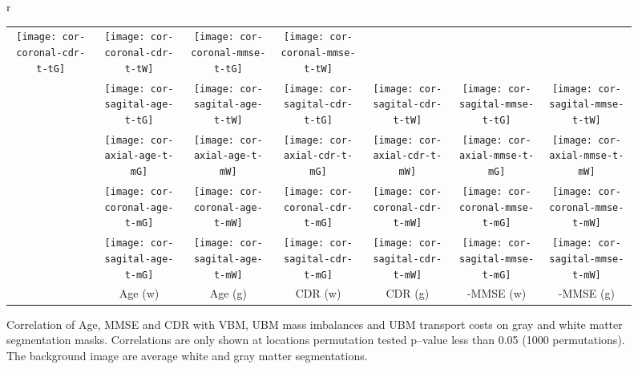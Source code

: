 \documentclass{llncs}
\begin{document}
\begin{figure}[!h]
\begin{tabular}{r}
\begin{tabular}{c|cc||cc||cc}
\texttt{[image: cor-coronal-cdr-t-tG]} &
\texttt{[image: cor-coronal-cdr-t-tW]} &
\texttt{[image: cor-coronal-mmse-t-tG]} &
\texttt{[image: cor-coronal-mmse-t-tW]} \\ 
&
\texttt{[image: cor-sagital-age-t-tG]} &
\texttt{[image: cor-sagital-age-t-tW]} &
\texttt{[image: cor-sagital-cdr-t-tG]} &
\texttt{[image: cor-sagital-cdr-t-tW]} &
\texttt{[image: cor-sagital-mmse-t-tG]} &
\texttt{[image: cor-sagital-mmse-t-tW]} \\ 
  \hline 
  \hline
  \raisebox{1mm}{ \multirow{3}{4mm}{ \rotatebox[origin=c]{90}{UTM Mass} }} &
\texttt{[image: cor-axial-age-t-mG]} &
\texttt{[image: cor-axial-age-t-mW]} &
\texttt{[image: cor-axial-cdr-t-mG]} &
\texttt{[image: cor-axial-cdr-t-mW]} &
\texttt{[image: cor-axial-mmse-t-mG]} &
\texttt{[image: cor-axial-mmse-t-mW]} \\ 
        &
\texttt{[image: cor-coronal-age-t-mG]} &
\texttt{[image: cor-coronal-age-t-mW]} &
\texttt{[image: cor-coronal-cdr-t-mG]} &
\texttt{[image: cor-coronal-cdr-t-mW]} &
\texttt{[image: cor-coronal-mmse-t-mG]} &
\texttt{[image: cor-coronal-mmse-t-mW]} \\ 
        &
\texttt{[image: cor-sagital-age-t-mG]} &
\texttt{[image: cor-sagital-age-t-mW]} &
\texttt{[image: cor-sagital-cdr-t-mG]} &
\texttt{[image: cor-sagital-cdr-t-mW]} &
\texttt{[image: cor-sagital-mmse-t-mG]} &
\texttt{[image: cor-sagital-mmse-t-mW]} \\ 

\hline \hline
& \parbox[b][3mm]{12mm}{Age (w)} 
& \parbox[b][3mm]{12mm}{Age (g)} 
& \parbox[b][3mm]{15mm}{CDR (w)} 
& \parbox[b][3mm]{15mm}{CDR (g) }
& \parbox[b][3mm]{15mm}{-MMSE (w)}
& \parbox[b][3mm]{15mm}{-MMSE (g)}
\end{tabular}
\end{tabular}
\caption{\label{fig:cor-oasis}
Correlation of Age, MMSE and CDR with VBM, UBM mass imbalances and UBM
transport costs on gray and white matter segmentation masks.  Correlations are
only shown at locations permutation tested p--value less than 0.05 (1000
permutations). The background image are average white and gray matter
segmentations.
\vspace{-5mm}
} 
\end{figure} \endgroup
\end{document}

